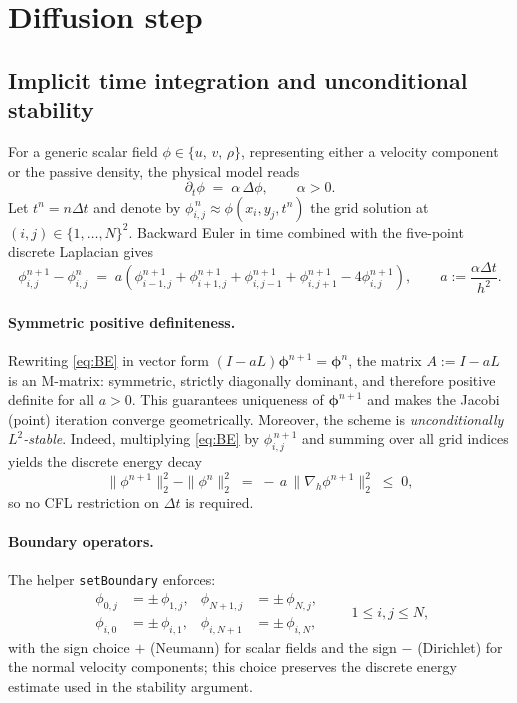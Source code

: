 \documentclass[11pt]{article}
\begin{document}
\section{Diffusion step}
\label{sec:diffusion}

\subsection{Implicit time integration and unconditional stability}

For a generic scalar field \(\phi \in \{u,\,v,\,\rho\}\), representing either a velocity component or the passive density, the physical model reads
\begin{equation}\label{eq:heat}
  \partial_t \phi \;=\; \alpha \,\Delta \phi,
  \qquad \alpha>0.
\end{equation}
Let $t^n=n\Delta t$ and denote by
$\phi_{i,j}^{\,n}\approx \phi(x_i,y_j,t^n)$ the grid solution
at $(i,j)\in\{1,\dots,N\}^2$.  
Backward Euler in time combined with the five-point discrete Laplacian
gives
\begin{equation}\label{eq:BE}
  \phi^{n+1}_{i,j} - \phi^{n}_{i,j}
  \;=\;
  a\!
  \left(
        \phi^{n+1}_{i-1,j}
      + \phi^{n+1}_{i+1,j}
      + \phi^{n+1}_{i,j-1}
      + \phi^{n+1}_{i,j+1}
      - 4\phi^{n+1}_{i,j}
  \right), 
  \qquad a:=\frac{\alpha\Delta t}{h^{2}}.
\end{equation}


\paragraph{Symmetric positive definiteness.}
Rewriting \eqref{eq:BE} in vector form
\((I-aL)\bm\phi^{n+1}=\bm\phi^{n}\),
the matrix \(A:=I-aL\) is an M-matrix:
symmetric, strictly diagonally dominant, and therefore
positive definite for all \(a>0\).
This guarantees uniqueness of \(\bm\phi^{n+1}\) and makes the
Jacobi (point) iteration converge geometrically.
Moreover, the scheme is \emph{unconditionally \(L^{2}\)-stable}.
Indeed, multiplying \eqref{eq:BE} by \(\phi^{\,n+1}_{i,j}\) and summing
over all grid indices yields the discrete energy decay
\[
   \|\phi^{n+1}\|_{2}^{2} - \|\phi^{n}\|_{2}^{2}
   \;=\;
   -\,a\,\|\nabla_{h}\phi^{n+1}\|_{2}^{2} \;\le\; 0,
\]
so no CFL restriction on \(\Delta t\) is required.


\paragraph{Boundary operators.}
The helper \verb|setBoundary| enforces:
\[
  \begin{aligned}
    \phi_{0  ,j} &= \pm \,\phi_{1  ,j}, &
    \phi_{N+1,j} &= \pm\,\phi_{N  ,j}, \\
    \phi_{i,0  } &= \pm\,\phi_{i,1  }, &
    \phi_{i,N+1} &= \pm\,\phi_{i,N  },
  \end{aligned}
  \qquad 1\le i,j\le N,
\]
with the sign choice $+$ (Neumann) for scalar fields and the sign
$-$ (Dirichlet) for the normal velocity components;
this choice preserves the discrete energy estimate used in the stability argument.
\end{document}
